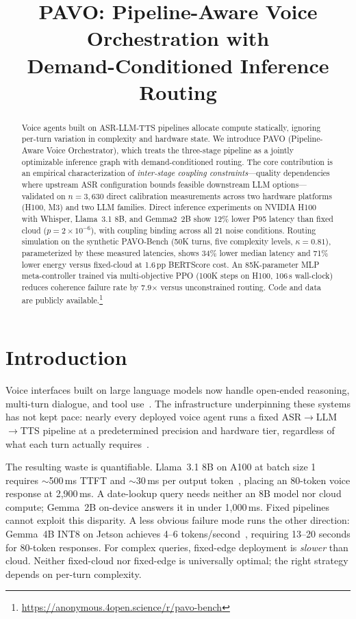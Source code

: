 \documentclass{article}
\title{PAVO: Pipeline-Aware Voice Orchestration with\\Demand-Conditioned Inference Routing}
\begin{document}
\maketitle

\begin{abstract}
Voice agents built on ASR-LLM-TTS pipelines allocate compute statically, ignoring per-turn variation in complexity and hardware state. We introduce PAVO (Pipeline-Aware Voice Orchestrator), which treats the three-stage pipeline as a jointly optimizable inference graph with demand-conditioned routing. The core contribution is an empirical characterization of \emph{inter-stage coupling constraints}---quality dependencies where upstream ASR configuration bounds feasible downstream LLM options---validated on $n=3{,}630$ direct calibration measurements across two hardware platforms (H100, M3) and two LLM families. Direct inference experiments on NVIDIA H100 with Whisper, Llama~3.1 8B, and Gemma2~2B show 12\% lower P95 latency than fixed cloud ($p = 2\times10^{-6}$), with coupling binding across all 21 noise conditions. Routing simulation on the synthetic PAVO-Bench (50K turns, five complexity levels, $\kappa=0.81$), parameterized by these measured latencies, shows 34\% lower median latency and 71\% lower energy versus fixed-cloud at 1.6\,pp BERTScore cost. An 85K-parameter MLP meta-controller trained via multi-objective PPO (100K steps on H100, 106\,s wall-clock) reduces coherence failure rate by 7.9$\times$ versus unconstrained routing. Code and data are publicly available.\footnote{\url{https://anonymous.4open.science/r/pavo-bench}}
\end{abstract}

\section{Introduction}
\label{sec:intro}

Voice interfaces built on large language models now handle open-ended reasoning, multi-turn dialogue, and tool use~\citep{openai2024gpt4o,dubey2024llama3,team2024gemma2}. The infrastructure underpinning these systems has not kept pace: nearly every deployed voice agent runs a fixed ASR$\to$LLM$\to$TTS pipeline at a predetermined precision and hardware tier, regardless of what each turn actually requires~\citep{oord2016wavenet,ren2021fastspeech,kim2021vits,dettmers2022llmint8,frantar2022gptq,lin2024awq}.

The resulting waste is quantifiable. Llama~3.1 8B on A100 at batch size 1 requires $\sim$500\,ms TTFT and $\sim$30\,ms per output token~\citep{mlperf2025}, placing an 80-token voice response at 2{,}900\,ms. A date-lookup query needs neither an 8B model nor cloud compute; Gemma~2B on-device answers it in under 1{,}000\,ms. Fixed pipelines cannot exploit this disparity. A less obvious failure mode runs the other direction: Gemma~4B INT8 on Jetson achieves 4--6 tokens/second~\citep{song2023powerinfer}, requiring 13--20 seconds for 80-token responses. For complex queries, fixed-edge deployment is \emph{slower} than cloud. Neither fixed-cloud nor fixed-edge is universally optimal; the right strategy depends on per-turn complexity.
\end{document}
